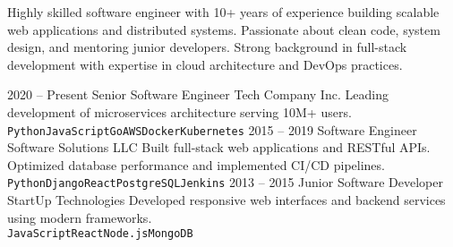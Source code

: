 \documentclass[9pt]{developercv} %
\begin{document}
\vspace{0.5cm}



\begin{minipage}[t]{0.4\textwidth} %
	\vspace{-\baselineskip} %
	
	Highly skilled software engineer with 10+ years of experience building scalable web applications and distributed systems. Passionate about clean code, system design, and mentoring junior developers. Strong background in full-stack development with expertise in cloud architecture and DevOps practices.
\end{minipage}
\hfill %
\begin{minipage}[t]{0.5\textwidth} %
	\vspace{-\baselineskip} %
	\begin{barchart}{5.5}
	\end{barchart}
\end{minipage}

\begin{center}
\end{center}



\begin{entrylist}
	\entry
		{2020 -- Present}
		{Senior Software Engineer}
		{Tech Company Inc.}
		{Leading development of microservices architecture serving 10M+ users. \\
		\texttt{Python}\slashsep\texttt{JavaScript}\slashsep\texttt{Go}\slashsep\texttt{AWS}\slashsep\texttt{Docker}\slashsep\texttt{Kubernetes}}
	\entry
		{2015 -- 2019}
		{Software Engineer}
		{Software Solutions LLC}
		{Built full-stack web applications and RESTful APIs. Optimized database performance and implemented CI/CD pipelines. \\
		\texttt{Python}\slashsep\texttt{Django}\slashsep\texttt{React}\slashsep\texttt{PostgreSQL}\slashsep\texttt{Jenkins}}
	\entry
		{2013 -- 2015}
		{Junior Software Developer}
		{StartUp Technologies}
		{Developed responsive web interfaces and backend services using modern frameworks. \\
		\texttt{JavaScript}\slashsep\texttt{React}\slashsep\texttt{Node.js}\slashsep\texttt{MongoDB}}
\end{entrylist}
\end{document}
